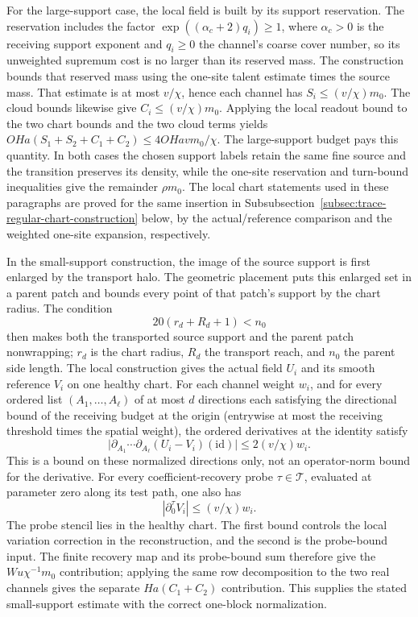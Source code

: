 For the large-support case, the local field is built by its support
reservation. The reservation includes the factor
\(\exp((\alpha_c+2)q_i)\geq1\), where \(\alpha_c>0\) is the receiving
support exponent and \(q_i\geq0\) the channel's coarse cover number, so
its unweighted supremum cost is no larger than its reserved mass. The
construction bounds that reserved mass using the one-site talent estimate
times the source mass. That estimate is at most \(v/\chi\), hence each
channel has \(S_i\leq(v/\chi)m_0\). The cloud bounds likewise give
\(C_i\leq(v/\chi)m_0\). Applying the local readout bound to the two chart
bounds and the two cloud terms yields
\(OHa(S_1+S_2+C_1+C_2)\leq4OHavm_0/\chi\). The large-support budget pays this
quantity. In both cases the chosen support labels retain the same fine
source and the transition preserves its density, while the one-site
reservation and turn-bound inequalities give the remainder \(\rho m_0\).
The local chart statements used in these paragraphs are proved for the
same insertion in Subsubsection~\ref{subsec:trace-regular-chart-construction}
below, by the actual/reference comparison and the weighted one-site
expansion, respectively.

In the small-support construction, the image of the source support is first
enlarged by the transport halo. The geometric placement puts this enlarged
set in a parent patch and bounds every point of that patch's support by the
chart radius. The condition
\[
 20(r_d+R_d+1)<n_0
\]
then makes both the transported source support and the parent patch
nonwrapping; \(r_d\) is the chart radius, \(R_d\) the transport reach, and
\(n_0\) the parent side length. The local construction gives the actual
field \(U_i\) and its smooth reference \(V_i\) on one healthy chart. For
each channel weight \(w_i\), and for every ordered list
\((A_1,\ldots,A_\ell)\) of at most \(d\) directions each satisfying the
directional bound of the receiving budget at the origin (entrywise at most
the receiving threshold times the spatial weight), the ordered derivatives
at the identity satisfy
\[
 \bigl|\partial_{A_1}\cdots\partial_{A_\ell}(U_i-V_i)(\mathrm{id})\bigr|
       \leq 2(v/\chi)w_i.
\]
This is a bound on these normalized directions only, not an operator-norm
bound for the derivative.
For every coefficient-recovery probe \(\tau\in\mathcal T\), evaluated at
parameter zero along its test path, one also has
\[
 |\partial^\tau_0 V_i|\leq(v/\chi)w_i.
\]
The probe stencil lies in the healthy chart. The first bound controls the
local variation correction in the reconstruction, and the second is the
probe-bound input. The finite recovery map and its probe-bound sum therefore
give the \(Wu\chi^{-1}m_0\) contribution; applying the same row decomposition
to the two real channels gives the separate \(Ha(C_1+C_2)\) contribution.
This supplies the stated small-support estimate with the correct one-block
normalization.

